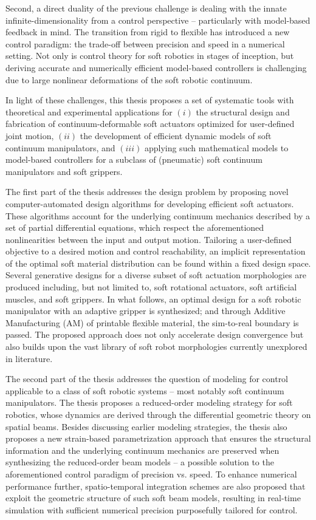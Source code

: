 Second, a direct duality of the previous challenge is dealing with the innate infinite-dimensionality from a control perspective -- particularly with model-based feedback in mind. The transition from rigid to flexible has introduced a new control paradigm: the trade-off between precision and speed in a numerical setting. Not only is control theory for soft robotics in stages of inception, but deriving accurate and numerically efficient model-based controllers is challenging due to large nonlinear deformations of the soft robotic continuum.

In light of these challenges, this thesis proposes a set of systematic tools with theoretical and experimental applications for $(i)$ 
the structural design and fabrication of continuum-deformable soft actuators optimized for user-defined joint motion, $(ii)$ the development of efficient dynamic models of soft continuum manipulators, and $(iii)$ applying such mathematical models to model-based controllers for a subclass of (pneumatic) soft continuum manipulators and soft grippers.

The first part of the thesis addresses the design problem by proposing novel computer-automated design algorithms for developing efficient soft actuators. These algorithms account for the underlying continuum mechanics described by a set of partial differential equations, which respect the aforementioned nonlinearities between the input and output motion. Tailoring a user-defined objective to a desired motion and control reachability, an implicit representation of the optimal soft material distribution can be found within a fixed design space. Several generative designs for a diverse subset of soft actuation morphologies are produced including, but not limited to, soft rotational actuators, soft artificial muscles, and soft grippers. In what follows, an optimal design for a soft robotic manipulator with an adaptive gripper is synthesized; and through Additive Manufacturing (AM) of printable flexible material, the sim-to-real boundary is passed. The proposed approach does not only accelerate design convergence but also builds upon the vast library of soft robot morphologies currently unexplored in literature.

The second part of the thesis addresses the question of modeling for control applicable to a class of soft robotic systems -- most notably soft continuum manipulators. The thesis proposes a reduced-order modeling strategy for soft robotics, whose dynamics are derived through the differential geometric theory on spatial beams. Besides discussing earlier modeling strategies, the thesis also proposes a new strain-based parametrization approach that ensures the structural information and the underlying continuum mechanics are preserved when synthesizing the reduced-order beam models -- a possible solution to the aforementioned control paradigm of precision vs. speed. To enhance numerical performance further, spatio-temporal integration schemes are also proposed that exploit the geometric structure of such soft beam models, resulting in real-time simulation with sufficient numerical precision purposefully tailored for control.

